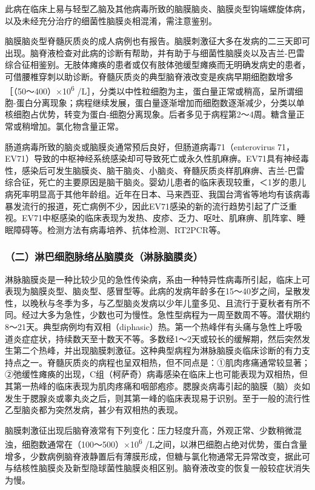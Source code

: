 此病在临床上易与轻型乙脑及其他病毒所致的脑膜脑炎、脑膜炎型钩端螺旋体病，以及未经充分治疗的细菌性脑膜炎相混淆，需注意鉴别。

脑膜脑炎型脊髓灰质炎的成人病例也有报告。脑膜刺激征大多在发病的二三天即可出现。脑脊液检查对此病的诊断有帮助，并有助于与细菌性脑膜炎以及吉兰-巴雷综合征相鉴别。无肢体瘫痪的患者或仅有肢体弛缓型瘫痪而无明确发病史的患者，可借腰椎穿刺以助诊断。脊髓灰质炎的典型脑脊液改变是疾病早期细胞数增多［（50～400）×10\textsuperscript{6}
/L］，分类以中性粒细胞为主，蛋白量正常或稍高，呈所谓细胞-蛋白分离现象；病程继续发展，蛋白量逐渐增加而细胞数逐渐减少，分类以单核细胞占优势，转变为蛋白-细胞分离现象。后者多见于病程第2～4周。糖含量正常或稍增加。氯化物含量正常。

肠道病毒所致的脑炎或脑膜炎通常预后良好，但肠道病毒71（enterovirus
71，EV71）导致的中枢神经系统感染却可导致死亡或永久性肌麻痹。EV71具有神经毒性，感染后可发生脑膜炎、脑干脑炎、小脑炎、脊髓灰质炎样肌麻痹、吉兰-巴雷综合征，死亡的主要原因是脑干脑炎。婴幼儿患者的临床表现较重，＜1岁的患儿病死率明显高于其他年龄组。近年在日本、马来西亚、我国台湾省等地均有该病毒暴发流行的报道，死亡病例不少，因此EV71感染的新的流行趋势引起了广泛重视。EV71中枢感染的临床表现为发热、皮疹、乏力、呕吐、肌麻痹、肌阵挛、睡眠障碍等。检测方法有病毒培养、抗体检测、RT2PCR等。

\subsubsection{（二）淋巴细胞脉络丛脑膜炎（淋脉脑膜炎）}

淋脉脑膜炎是一种比较少见的急性传染病，系由一种特异性病毒所引起，临床上可表现为脑膜炎型、脑炎型、感冒型等。此病的发病年龄多在15～40岁之间，呈散发性，以晚秋与冬季为多，与乙型脑炎发病以少年儿童多见、且流行于夏秋者有所不同。经过大多为急性，少数也可为慢性。急性型病程为一周至数周不等。潜伏期约8～21天。典型病例均有双相（diphasic）热。第一个热峰伴有头痛与急性上呼吸道炎症症状，持续数天至十数天不等。多数经1～2天或较长的缓解期，然后突然发生第二个热峰，并出现脑膜刺激征。这种典型病程为淋脉脑膜炎临床诊断的有力支持点之一。脊髓灰质炎的病程也呈双相热，但不同点是：①肌肉疼痛通常较显著；②弛缓性瘫痪的出现，C组（柯萨奇）病毒感染在临床上也可能表现为双相热，但其第一热峰的临床表现为肌肉疼痛和咽部疱疹。腮腺炎病毒引起的脑膜（脑）炎如发生于腮腺炎或睾丸炎之后，则其第一峰的临床表现易于识别。至于一般的流行性乙型脑炎都为突然发病，甚少有双相热的表现。

脑膜刺激征出现后脑脊液常有下列变化：压力轻度升高，外观正常、少数稍微混浊，细胞数通常在（100～500）×10\textsuperscript{6}
/L之间，以淋巴细胞占绝对优势，蛋白含量增多，少数病例脑脊液静置后有薄膜形成，但糖与氯化物通常无异常改变，据此可与结核性脑膜炎及新型隐球菌性脑膜炎相区别。脑脊液改变的恢复一般较症状消失为慢。

